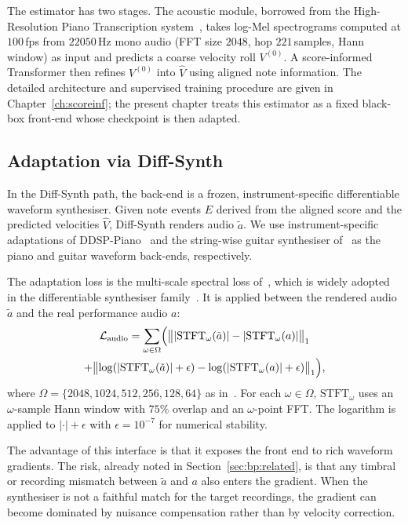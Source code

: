 The estimator has two stages. The acoustic module, borrowed from the High-Resolution Piano Transcription system~\cite{kong2021hpt}, takes log-Mel spectrograms computed at $100$\,fps from $22050$\,Hz mono audio (FFT size $2048$, hop $221$\,samples, Hann window) as input and predicts a coarse velocity roll $V^{(0)}$. A score-informed Transformer then refines $V^{(0)}$ into $\hat{V}$ using aligned note information. The detailed architecture and supervised training procedure are given in Chapter~\ref{ch:scoreinf}; the present chapter treats this estimator as a fixed black-box front-end whose checkpoint is then adapted.

\subsection{Adaptation via Diff-Synth}
\label{ssec:bp:adapt_diffsynth}

In the Diff-Synth path, the back-end is a frozen, instrument-specific differentiable waveform synthesiser. Given note events $E$ derived from the aligned score and the predicted velocities $\hat{V}$, Diff-Synth renders audio $\tilde{a}$. We use instrument-specific adaptations of DDSP-Piano~\cite{renault2023ddsp_piano} and the string-wise guitar synthesiser of~\cite{jonason2024guitar} as the piano and guitar waveform back-ends, respectively.

The adaptation loss is the multi-scale spectral loss of~\cite{engel2020ddsp}, which is widely adopted in the differentiable synthesiser family~\cite{renault2023ddsp_piano, jonason2024guitar, wu2022mididdsp}. It is applied between the rendered audio $\tilde{a}$ and the real performance audio $a$:
\begin{multline}
\label{eq:bp_audio_loss}
\mathcal{L}_{\mathrm{audio}}
= \sum_{\omega \in \Omega} \Bigl(
\bigl\lVert \lvert\mathrm{STFT}_{\omega}(\tilde{a})\rvert - \lvert\mathrm{STFT}_{\omega}(a)\rvert \bigr\rVert_1 \\
+ \bigl\lVert \log(\lvert\mathrm{STFT}_{\omega}(\tilde{a})\rvert+\epsilon) - \log(\lvert\mathrm{STFT}_{\omega}(a)\rvert+\epsilon) \bigr\rVert_1
\Bigr),
\end{multline}
where $\Omega = \{2048, 1024, 512, 256, 128, 64\}$ as in~\cite{engel2020ddsp}. For each $\omega \in \Omega$, $\mathrm{STFT}_{\omega}$ uses an $\omega$-sample Hann window with $75\%$ overlap and an $\omega$-point FFT. The logarithm is applied to $\lvert\cdot\rvert + \epsilon$ with $\epsilon = 10^{-7}$ for numerical stability.

The advantage of this interface is that it exposes the front end to rich waveform gradients. The risk, already noted in Section~\ref{sec:bp:related}, is that any timbral or recording mismatch between $\tilde{a}$ and $a$ also enters the gradient. When the synthesiser is not a faithful match for the target recordings, the gradient can become dominated by nuisance compensation rather than by velocity correction.

